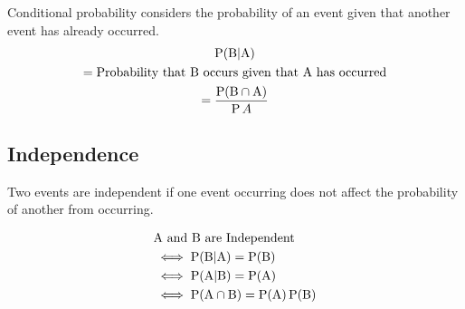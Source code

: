\documentclass[../main]{subfiles}
\begin{document}
	Conditional probability considers the probability of an event given that another event has already occurred. \\

	\begin{equation*} \begin{gathered}
		\operatorname{P}(\text{B} | \text{A}) \\
		= \text{Probability that B occurs given that A has occurred} \\
		= \frac{\operatorname{P}(\text{B} \cap \text{A})}{\operatorname{P}{A}}
	\end{gathered} \end{equation*}

	\subsection{Independence}

	Two events are independent if one event occurring does not affect the probability of another from occurring.

	\begin{equation*} \begin{aligned}
		& \text{A and B are Independent} \\
		& \iff \operatorname{P}(\text{B} | \text{A}) = \operatorname{P}(\text{B}) \\
		& \iff \operatorname{P}(\text{A} | \text{B}) = \operatorname{P}(\text{A}) \\
		& \iff \operatorname{P}(\text{A} \cap \text{B}) = \operatorname{P}(\text{A}) \operatorname{P}(\text{B}) \\
	\end{aligned} \end{equation*}
\end{document}
